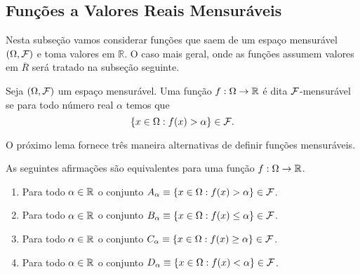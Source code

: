 \subsection*{Funções a Valores Reais Mensuráveis}

Nesta subseção vamos considerar funções que
saem de um espaço mensurável $(\Omega,\mathcal{F})$ e toma 
valores em $\mathbb{R}$. O caso mais geral, onde
as funções assumem valores em $\overline{R}$ será
tratado na subseção seguinte.


\begin{definicao} 
Seja $(\Omega,\mathcal{F})$ um espaço mensurável. 
Uma função $f:\Omega\to\mathbb{R}$ é dita $\mathcal{F}$-mensurável
se para todo número real $\alpha$ temos que
\[
	\{x\in\Omega : f(x)>\alpha \} \in \mathcal{F}.
\]
\end{definicao}

O próximo lema fornece três maneira alternativas de
definir funções mensuráveis. 

\begin{lema}
As seguintes afirmações são equivalentes para uma função 
$f:\Omega\to\mathbb{R}$.
\begin{enumerate}
	\item 
	Para todo $\alpha\in\mathbb{R}$ o conjunto 
	$A_{\alpha}\equiv\{x\in\Omega : f(x)>\alpha \} \in \mathcal{F}$.

	\item 
	Para todo $\alpha\in\mathbb{R}$ o conjunto 
	$B_{\alpha}\equiv\{x\in\Omega : f(x)\leq \alpha \} \in \mathcal{F}$.

	\item 
	Para todo $\alpha\in\mathbb{R}$ o conjunto 
	$C_{\alpha}\equiv\{x\in\Omega : f(x)\geq\alpha \} \in \mathcal{F}$.

	\item 
	Para todo $\alpha\in\mathbb{R}$ o conjunto 
	$D_{\alpha}\equiv\{x\in\Omega : f(x)<\alpha \} \in \mathcal{F}$.
	
\end{enumerate}
\end{lema}

